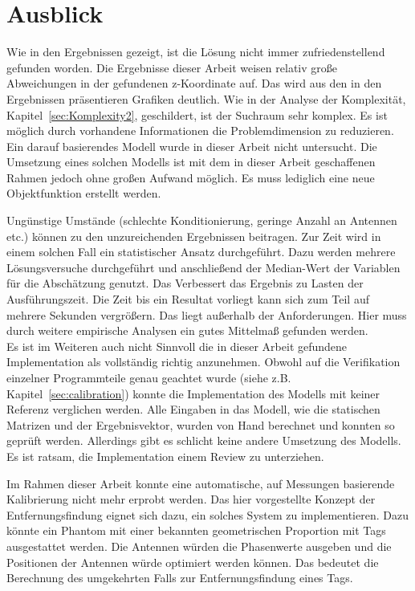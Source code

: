 %
\section{Ausblick}
\label{sec:Calibration_Optimaztion}
%
Wie in den Ergebnissen gezeigt, ist die Lösung nicht immer zufriedenstellend gefunden worden. Die Ergebnisse dieser Arbeit weisen relativ große Abweichungen in der gefundenen z-Koordinate auf. Das wird aus den in den Ergebnissen präsentieren Grafiken deutlich. Wie in der Analyse der Komplexität, Kapitel~\ref{sec:Komplexity2}, geschildert, ist der Suchraum sehr komplex. Es ist möglich durch vorhandene Informationen die Problemdimension zu reduzieren. Ein darauf basierendes Modell wurde in dieser Arbeit nicht untersucht. Die Umsetzung eines solchen Modells ist mit dem in dieser Arbeit geschaffenen Rahmen jedoch ohne großen Aufwand möglich. Es muss lediglich eine neue Objektfunktion erstellt werden.

Ungünstige Umstände (schlechte Konditionierung, geringe Anzahl an Antennen etc.) können zu den unzureichenden Ergebnissen beitragen. Zur Zeit wird in einem solchen Fall ein statistischer Ansatz durchgeführt. Dazu werden mehrere Lösungsversuche durchgeführt und anschließend der Median-Wert der Variablen für die Abschätzung genutzt. Das Verbessert das Ergebnis zu Lasten der Ausführungszeit. Die Zeit bis ein Resultat vorliegt kann sich zum Teil auf mehrere Sekunden vergrößern. Das liegt außerhalb der Anforderungen. Hier muss durch weitere empirische Analysen ein gutes Mittelmaß gefunden werden.\\
%

Es ist im Weiteren auch nicht Sinnvoll die in dieser Arbeit gefundene Implementation als vollständig richtig anzunehmen. Obwohl auf die Verifikation einzelner Programmteile genau geachtet wurde (siehe z.B. Kapitel~\ref{sec:calibration}) konnte die Implementation des Modells mit keiner Referenz verglichen werden. Alle Eingaben in das Modell, wie die statischen Matrizen und der Ergebnisvektor, wurden von Hand berechnet und konnten so geprüft werden. Allerdings gibt es schlicht keine andere Umsetzung des Modells. Es ist ratsam, die Implementation einem Review zu unterziehen.
%

Im Rahmen dieser Arbeit konnte eine automatische, auf Messungen basierende Kalibrierung nicht mehr erprobt werden. Das hier vorgestellte Konzept der Entfernungsfindung eignet sich dazu, ein solches System zu implementieren. Dazu könnte ein Phantom mit einer bekannten geometrischen Proportion mit Tags ausgestattet werden. Die Antennen würden die Phasenwerte ausgeben und die Positionen der Antennen würde optimiert werden können. Das bedeutet die Berechnung des umgekehrten Falls zur Entfernungsfindung eines Tags.\\
%

